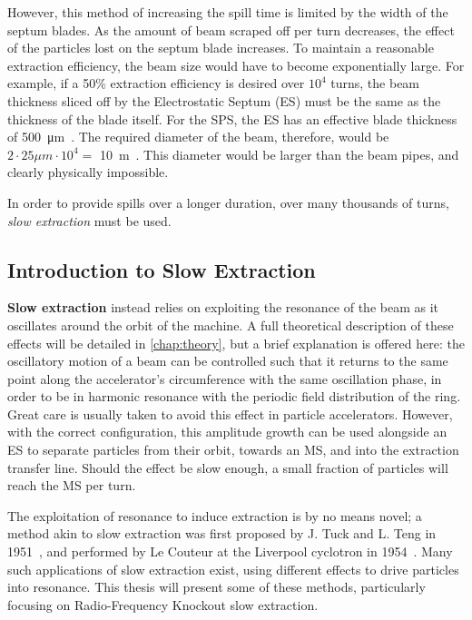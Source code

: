\documentclass[a4paper,twoside,11pt]{report}
\begin{document}
However, this method of increasing the spill time is limited by the width of the septum blades. As the amount of beam scraped off per turn decreases, the effect of the particles lost on the septum blade increases. To maintain a reasonable extraction efficiency, the beam size would have to become exponentially large. For example, if a 50\% extraction efficiency is desired over $10^4$ turns, the beam thickness sliced off by the Electrostatic Septum (ES) must be the same as the thickness of the blade itself. For the SPS, the ES has an effective blade thickness of \qty{500}{\micro\meter}~\cite{sps-es.23.023501}. The required diameter of the beam, therefore, would be $2\cdot 25\mu m\cdot 10^4 = $ \qty{10}{\meter}~\cite{brunner}. This diameter would be larger than the beam pipes, and clearly physically impossible.

In order to provide spills over a longer duration, over many thousands of turns, \textit{slow extraction} must be used. 

\subsection{Introduction to Slow Extraction}

\textbf{Slow extraction} instead relies on exploiting the resonance of the beam as it oscillates around the orbit of the machine. A full theoretical description of these effects will be detailed in \autoref{chap:theory}, but a brief explanation is offered here: the oscillatory motion of a beam can be controlled such that it returns to the same point along the accelerator's circumference with the same oscillation phase, in order to be in harmonic resonance with the periodic field distribution of the ring. Great care is usually taken to avoid this effect in particle accelerators. However, with the correct configuration, this amplitude growth can be used alongside an ES to separate particles from their orbit, towards an MS, and into the extraction transfer line. Should the effect be slow enough, a small fraction of particles will reach the MS per turn.

The exploitation of resonance to induce extraction is by no means novel; a method akin to slow extraction was first proposed by J. Tuck and L. Teng in 1951~\cite{Couteur_1951}, and performed by Le Couteur at the Liverpool cyclotron in 1954~\cite{Couteur_1955}. Many such applications of slow extraction exist, using different effects to drive particles into resonance. This thesis will present some of these methods, particularly focusing on Radio-Frequency Knockout slow extraction.
\end{document}
